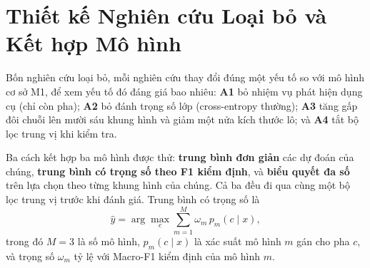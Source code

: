 \section{Thiết kế Nghiên cứu Loại bỏ và Kết hợp Mô hình}

Bốn nghiên cứu loại bỏ, mỗi nghiên cứu thay đổi đúng một yếu tố so với mô hình cơ sở M1, để xem yếu tố đó đáng giá bao nhiêu: \textbf{A1} bỏ nhiệm vụ phát hiện dụng cụ (chỉ còn pha); \textbf{A2} bỏ đánh trọng số lớp (cross-entropy thường); \textbf{A3} tăng gấp đôi chuỗi lên mười sáu khung hình và giảm một nửa kích thước lô; và \textbf{A4} tắt bộ lọc trung vị khi kiểm tra.

Ba cách kết hợp ba mô hình được thử: \textbf{trung bình đơn giản} các dự đoán của chúng, \textbf{trung bình có trọng số theo F1 kiểm định}, và \textbf{biểu quyết đa số} trên lựa chọn theo từng khung hình của chúng. Cả ba đều đi qua cùng một bộ lọc trung vị trước khi đánh giá. Trung bình có trọng số là
\begin{equation}
\hat{y} = \arg\max_c \sum_{m=1}^{M} \omega_m \, p_m(c \mid x),
\label{eq:vn_ensemble}
\end{equation}
trong đó $M = 3$ là số mô hình, $p_m(c \mid x)$ là xác suất mô hình $m$ gán cho pha $c$, và trọng số $\omega_m$ tỷ lệ với Macro-F1 kiểm định của mô hình $m$.
